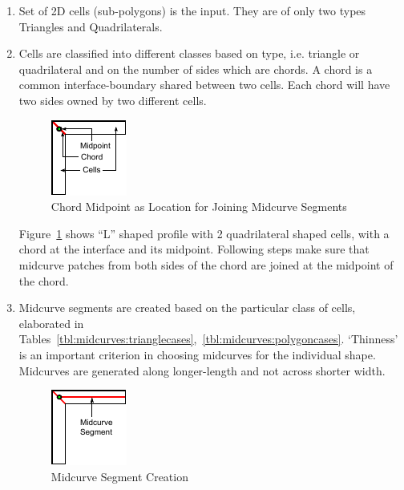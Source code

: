 \begin{enumerate} [noitemsep,topsep=2pt,parsep=2pt,partopsep=2pt]
\item Set of 2D cells (sub-polygons) is the input. They are of only two types Triangles and Quadrilaterals. 
\item Cells are classified into different classes based on type, i.e. triangle or quadrilateral and on the number of sides which are chords. A chord is a common interface-boundary shared between two cells. Each chord will have two sides owned by two different cells. 


\begin{figure}[h]
\centering \includegraphics[width=0.25\linewidth]{../Common/images/midcurve_polydecomp_2.pdf} 
\caption{Chord Midpoint as Location for Joining Midcurve Segments}
\label{fig_midcurvechords}
\end{figure}


Figure~\ref{fig_midcurvechords} shows ``L'' shaped profile with 2 quadrilateral shaped cells, with a chord at the interface and its midpoint. Following steps make sure that midcurve patches from both sides of the chord are joined at the midpoint of the chord.
\item Midcurve segments are created based on the particular class of cells, elaborated in Tables~\ref{tbl:midcurves:trianglecases},~\ref{tbl:midcurves:polygoncases}. `Thinness' is an important criterion in choosing midcurves for the individual shape. Midcurves are generated along longer-length and not across shorter width.


\begin{figure}[h]
\centering \includegraphics[width=0.25\linewidth]{../Common/images/midcurve_polymid_2.pdf} 
\caption{Midcurve Segment Creation}
\label{fig_polymid}
\end{figure}


\end{enumerate}
